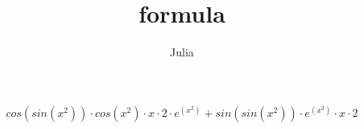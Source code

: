 \documentclass{article}
\title{formula}
\author{Julia}
\begin{document}
\maketitle

$$cos(sin(x ^ {2})) \cdot cos(x ^ {2}) \cdot x \cdot 2 \cdot e^{(x ^ {2})} + sin(sin(x ^ {2})) \cdot e^{(x ^ {2})} \cdot x \cdot 2$$
\end{document}
